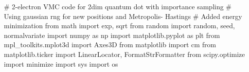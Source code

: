 \documentclass[%
oneside,                 %
final,                   %
10pt]{article}
\begin{document}
\bpycod
# 2-electron VMC code for 2dim quantum dot with importance sampling
# Using gaussian rng for new positions and Metropolis- Hastings 
# Added energy minimization
from math import exp, sqrt
from random import random, seed, normalvariate
import numpy as np
import matplotlib.pyplot as plt
from mpl_toolkits.mplot3d import Axes3D
from matplotlib import cm
from matplotlib.ticker import LinearLocator, FormatStrFormatter
from scipy.optimize import minimize
import sys
import os
\end{document}
